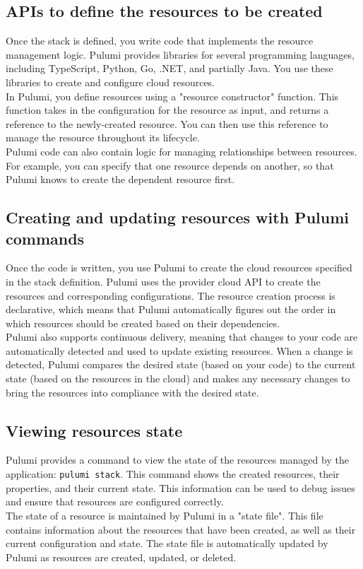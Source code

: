 \subsection{APIs to define the resources to be created}
Once the stack is defined, you write code that implements the resource management logic.
Pulumi provides libraries for several programming languages, including TypeScript, Python, Go, .NET, and partially Java.
You use these libraries to create and configure cloud resources.\\
In Pulumi, you define resources using a "resource constructor" function.
This function takes in the configuration for the resource as input, and returns a reference to the newly-created resource.
You can then use this reference to manage the resource throughout its lifecycle.\\
Pulumi code can also contain logic for managing relationships between resources.
For example, you can specify that one resource depends on another, so that Pulumi knows to create the dependent resource first.

\subsection{Creating and updating resources with Pulumi commands}
Once the code is written, you use Pulumi to create the cloud resources specified in the stack definition.
Pulumi uses the provider cloud API to create the resources and corresponding configurations. 
The resource creation process is declarative, which means that Pulumi automatically figures out the order in which resources should be created based on their dependencies.\\
Pulumi also supports continuous delivery, meaning that changes to your code are automatically detected and used to update existing resources.
When a change is detected, Pulumi compares the desired state (based on your code) to the current state (based on the resources in the cloud) and makes any necessary changes to bring the resources into compliance with the desired state.

\subsection{Viewing resources state}
Pulumi provides a command to view the state of the resources managed by the application: \texttt{pulumi stack}.
This command shows the created resources, their properties, and their current state. 
This information can be used to debug issues and ensure that resources are configured correctly.\\
The state of a resource is maintained by Pulumi in a "state file".
This file contains information about the resources that have been created, as well as their current configuration and state.
The state file is automatically updated by Pulumi as resources are created, updated, or deleted.

